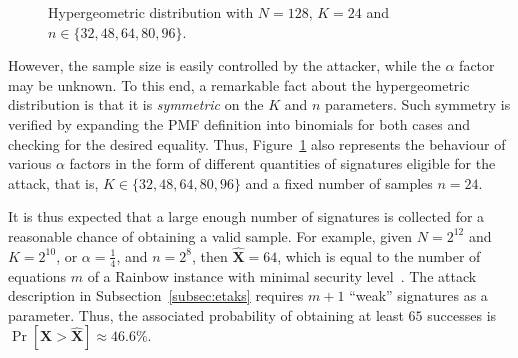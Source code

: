 \documentclass[english]{ufsc-thesis-rn46-2019/ufsc-thesis-rn46-2019}
\theoremstyle{definition}
\begin{document}
\begin{figure}[htbp]
  \caption{Hypergeometric distribution with
    $N = 128$, $K = 24$ and $n \in \{32, 48, 64, 80, 96\}$.}\label{fig:hyper}
\end{figure}

However, the sample size is easily controlled by the attacker, while the
$\alpha$ factor may be unknown. To this end, a remarkable fact about the
hypergeometric distribution is that it is \emph{symmetric} on the $K$ and $n$
parameters. Such symmetry is verified by expanding the PMF definition into
binomials for both cases and checking for the desired equality. Thus,
Figure~\ref{fig:hyper} also represents the behaviour of various $\alpha$
factors in the form of different quantities of signatures eligible for the
attack, that is, $K \in \{32, 48, 64, 80, 96\}$ and a fixed number of samples
$n = 24$.

It is thus expected that a large enough number of signatures is collected for
a reasonable chance of obtaining a valid sample. For example, given
$N = 2^{12}$ and $K = 2^{10}$, or $\alpha = \frac{1}{4}$, and $n = 2^{8}$, then
$\widehat{\mathbf{X}} = 64$, which is equal to the number of equations $m$ of
a Rainbow instance with minimal security
level~\cite[Sec.~2.8]{Ding:201901}. The attack description in
Subsection~\ref{subsec:etaks} requires $m + 1$ ``weak'' signatures as
a parameter. Thus, the associated probability of obtaining at least $65$
successes is $\Pr[\mathbf{X} > \widehat{\mathbf{X}}] \approx 46.6\%$.
\end{document}
